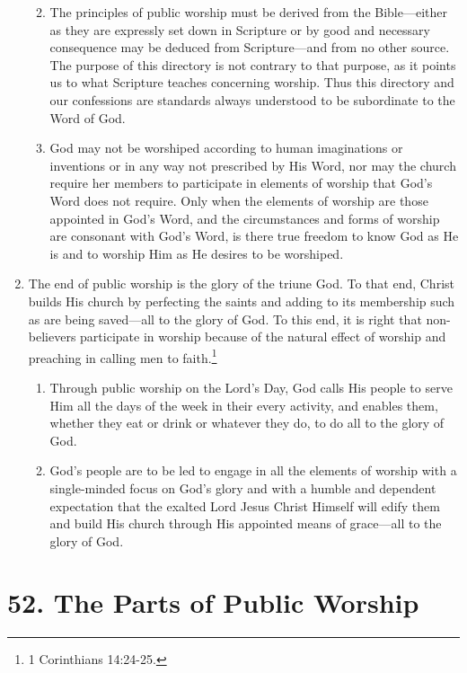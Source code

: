 \documentclass[
]{book}
\providecommand{\tightlist}{%
  \setlength{\itemsep}{0pt}\setlength{\parskip}{0pt}}
\begin{document}
\begin{enumerate}
  \begin{enumerate}
  \def\labelenumii{\alph{enumii}.}
  \tightlist
  \item
    The principles of public worship must be derived from the Bible---either as they are expressly set down in Scripture or by good and necessary consequence may be deduced from Scripture---and from no other source. The purpose of this directory is not contrary to that purpose, as it points us to what Scripture teaches concerning worship. Thus this directory and our confessions are standards always understood to be subordinate to the Word of God.
  \item
    God may not be worshiped according to human imaginations or inventions or in any way not prescribed by His Word, nor may the church require her members to participate in elements of worship that God's Word does not require. Only when the elements of worship are those appointed in God's Word, and the circumstances and forms of worship are consonant with God's Word, is there true freedom to know God as He is and to worship Him as He desires to be worshiped.
  \end{enumerate}
\item
  The end of public worship is the glory of the triune God. To that end, Christ builds His church by perfecting the saints and adding to its membership such as are being saved---all to the glory of God. To this end, it is right that non-believers participate in worship because of the natural effect of worship and preaching in calling men to faith.\footnote{1 Corinthians 14:24-25.}

  \begin{enumerate}
  \def\labelenumii{\alph{enumii}.}
  \tightlist
  \item
    Through public worship on the Lord's Day, God calls His people to serve Him all the days of the week in their every activity, and enables them, whether they eat or drink or whatever they do, to do all to the glory of God.
  \item
    God's people are to be led to engage in all the elements of worship with a single-minded focus on God's glory and with a humble and dependent expectation that the exalted Lord Jesus Christ Himself will edify them and build His church through His appointed means of grace---all to the glory of God.
  \end{enumerate}
\end{enumerate}

\hypertarget{the-parts-of-public-worship}{%
\section*{52. The Parts of Public Worship}\label{the-parts-of-public-worship}}
\end{document}
